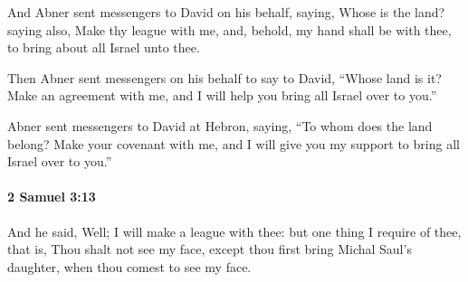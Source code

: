 			\begin{versebox}
					\item[BHS] 
					\item[ASV] And Abner sent messengers to David on his behalf, saying, Whose is the land? saying also, Make thy league with me, and, behold, my hand shall be with thee, to bring about all Israel unto thee.
					\item[NIV] Then Abner sent messengers on his behalf to say to David, “Whose land is it? Make an agreement with me, and I will help you bring all Israel over to you.”
					\item[NRSV] Abner sent messengers to David at Hebron, saying, “To whom does the land belong? Make your covenant with me, and I will give you my support to bring all Israel over to you.”
			\end{versebox}

		\paragraph{2 Samuel 3:13} %
			\label{2SAMUEL-3-13}

			And he said, Well; I will make a league with thee: but one thing I require of thee, that is, Thou shalt not see my face, except thou first bring Michal Saul’s daughter, when thou comest to see my face.

